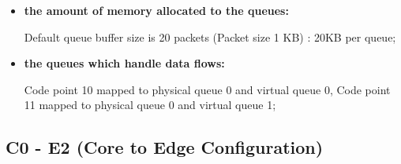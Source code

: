 \documentclass[conference,compsoc]{IEEEtran}
\begin{document}
\begin{itemize}
     \vspace{5mm}
     \item \textbf{the amount of memory allocated to the queues:}\par

     Default queue buffer size is 20 packets (Packet size 1 KB) : 20KB per queue;


     \vspace{5mm}
     \item \textbf{the queues which handle data flows:}\par
     Code point 10 mapped to physical queue 0 and virtual queue 0, Code point 11 mapped to physical queue 0 and virtual queue 1;

     \end{itemize}





     \subsection{C0 - E2 (Core to Edge Configuration)}
\end{document}
